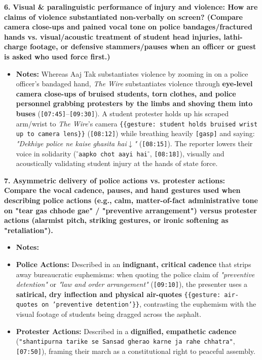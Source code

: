 \documentclass[10pt,a4paper]{article}
\begin{document}
\noindent\textbf{6.} \textbf{Visual \& paralinguistic performance of injury and violence: How are claims of violence substantiated non-verbally on screen? (Compare camera close-ups and pained vocal tone on police bandages/fractured hands vs. visual/acoustic treatment of student head injuries, lathi-charge footage, or defensive stammers/pauses when an officer or guest is asked who used force first.)}\par\smallskip
\begin{itemize}
  \item \textbf{Notes:}
Whereas Aaj Tak substantiates violence by zooming in on a police officer's bandaged hand, \textit{The Wire} substantiates violence through \textbf{eye-level camera close-ups of bruised students, torn clothes, and police personnel grabbing protesters by the limbs and shoving them into buses} (\texttt{[07:45]}--\texttt{[09:30]}). A student protester holds up his scraped arm/wrist to \textit{The Wire}'s camera \texttt{\{\{gesture: student holds bruised wrist up to camera lens\}\}} (\texttt{[08:12]}) while breathing heavily \texttt{[gasp]} and saying: \textit{"Dekhiye police ne kaise ghasita hai$\downarrow$"} (\texttt{[08:15]}). The reporter lowers their voice in solidarity (\texttt{$^\circ$aapko chot aayi hai$^\circ$}, \texttt{[08:18]}), visually and acoustically validating student injury at the hands of state force.\par\smallskip
\end{itemize}

\noindent\textbf{7.} \textbf{Asymmetric delivery of police actions vs. protester actions: Compare the vocal cadence, pauses, and hand gestures used when describing police actions (e.g., calm, matter-of-fact administrative tone on "tear gas chhode gae" / "preventive arrangement") versus protester actions (alarmist pitch, striking gestures, or ironic softening as "retaliation").}\par\smallskip
\begin{itemize}
  \item \textbf{Notes:}
  \item \textbf{Police Actions:} Described in an \textbf{indignant, critical cadence} that strips away bureaucratic euphemisms: when quoting the police claim of \textit{"preventive detention"} or \textit{"law and order arrangement"} (\texttt{[09:10]}), the presenter uses a \textbf{satirical, dry inflection and physical air-quotes} \texttt{\{\{gesture: air-quotes on 'preventive detention'\}\}}, contrasting the euphemism with the visual footage of students being dragged across the asphalt.
  \item \textbf{Protester Actions:} Described in a \textbf{dignified, empathetic cadence} (\texttt{"shantipurna tarike se Sansad gherao karne ja rahe chhatra"}, \texttt{[07:50]}), framing their march as a constitutional right to peaceful assembly.
\end{itemize}
\end{document}
